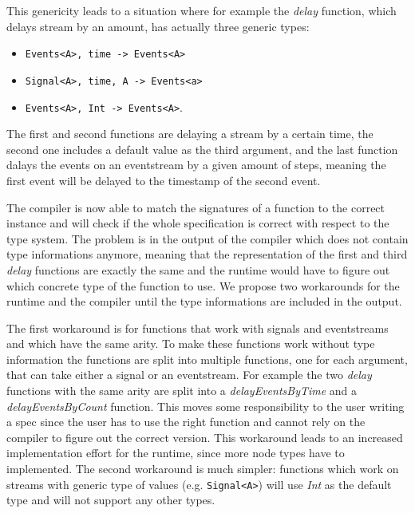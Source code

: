 This genericity leads to a situation where for example the \emph{delay} function, which delays stream by an amount, has actually three generic types:

\begin{samepage}
  \begin{itemize}
    \item \lstinline{Events<A>, time -> Events<A>}
    \item \lstinline{Signal<A>, time, A -> Events<a>}
    \item \lstinline{Events<A>, Int -> Events<A>}.
  \end{itemize}
\end{samepage}

The first and second functions are delaying a stream by a certain time, the second one includes a default value as the third argument, and the last function dalays the events on an eventstream by a given amount of steps, meaning the first event will be delayed to the timestamp of the second event.

The compiler is now able to match the signatures of a function to the correct instance and will check if the whole specification is correct with respect to the type system.
The problem is in the output of the compiler which does not contain type informations anymore, meaning that the representation of the first and third \emph{delay} functions are exactly the same and the runtime would have to figure out which concrete type of the function to use.
We propose two workarounds for the runtime and the compiler until the type informations are included in the output.

The first workaround is for functions that work with signals and eventstreams and which have the same arity.
To make these functions work without type information the functions are split into multiple functions, one for each argument, that can take either a signal or an eventstream.
For example the two \emph{delay} functions with the same arity are split into a \emph{delayEventsByTime} and a \emph{delayEventsByCount} function.
This moves some responsibility to the user writing a spec since the user has to use the right function and cannot rely on the compiler to figure out the correct version.
This workaround leads to an increased implementation effort for the runtime, since more node types have to implemented.
The second workaround is much simpler: functions which work on streams with generic type of values (e.g. \lstinline{Signal<A>}) will use \emph{Int} as the default type and will not support any other types.

